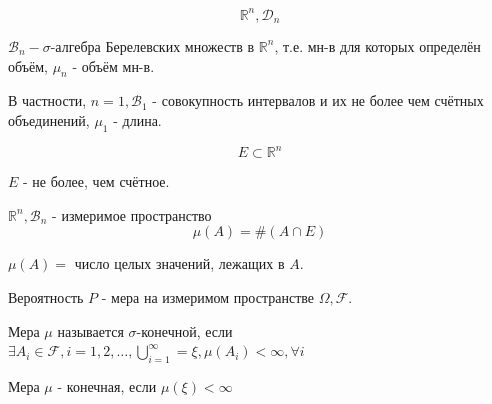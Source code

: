 \begin{exmp}
	\[ \mathbb{R}^n, \mathcal{D}_n \]
	
	$\mathcal{B}_n - \sigma$-алгебра Берелевских множеств в $\mathbb{R}^n$, т.е. мн-в для которых определён объём, $\mu_n$ - объём мн-в.
	
	В частности, $n=1, \mathcal{B}_1$ - совокупность интервалов и их не более чем счётных объединений, $\mu_1$ -  длина.
\end{exmp}

\begin{exmp}
	\[ E \subset \mathbb{R}^n \]
	
	$E$ - не более, чем счётное.
	
	$\mathbb{R}^n, \mathcal{B}_n$ - измеримое пространство
	\[ \mu(A) = \#(A \cap E) \]
\end{exmp}

\begin{exmp}
	$\mu(A) = $ число целых значений, лежащих в $A$.
\end{exmp}

\begin{exmp}
	Вероятность $P$ - мера на измеримом пространстве $\Omega, \mathcal{F}$.
\end{exmp}

\begin{definition}
	Мера $\mu$ называется $\sigma$-конечной, если $\exists A_i \in \mathcal{F}, i = 1, 2, \dots, \bigcup_{i=1}^{\infty} = \xi, \mu(A_i) < \infty, \forall i$
	
	Мера $\mu$ - конечная, если $\mu(\xi) < \infty$
\end{definition}

